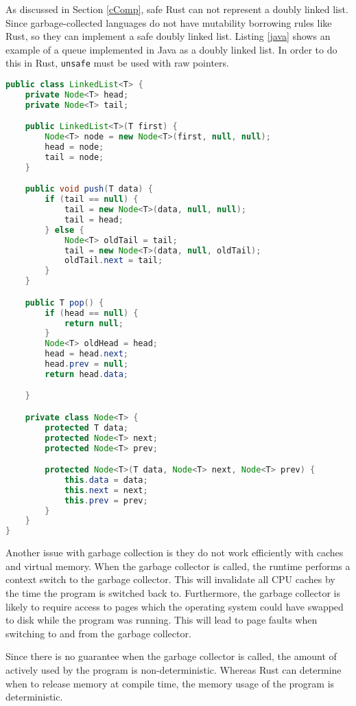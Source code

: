 \documentclass[10pt,a4paper,twocolumn]{article}
\begin{document}
As discussed in Section \ref{cComp}, safe Rust can not represent a doubly linked list.
Since garbage-collected languages do not have mutability borrowing rules like Rust, so they can
implement a safe doubly linked list.
Listing \ref{java} shows an example of a queue implemented in Java as a doubly linked list.
In order to do this in Rust, \lstinline{unsafe} must be used with raw pointers.

\begin{lstlisting}[language=Java, caption={An example of a queue in Java implemented as a doubly
	linked list.}, label=java]
public class LinkedList<T> {
	private Node<T> head;
	private Node<T> tail;

	public LinkedList<T>(T first) {
		Node<T> node = new Node<T>(first, null, null);
		head = node;
		tail = node;
	}

	public void push(T data) {
		if (tail == null) {
			tail = new Node<T>(data, null, null);
			tail = head;
		} else {
			Node<T> oldTail = tail;
			tail = new Node<T>(data, null, oldTail);
			oldTail.next = tail;
		}
	}

	public T pop() {
		if (head == null) {
			return null;
		}
		Node<T> oldHead = head;
		head = head.next;
		head.prev = null;
		return head.data;

	}

	private class Node<T> {
		protected T data;
		protected Node<T> next;
		protected Node<T> prev;

		protected Node<T>(T data, Node<T> next, Node<T> prev) {
			this.data = data;
			this.next = next;
			this.prev = prev;
		}
	}
}
\end{lstlisting}

Another issue with garbage collection is they do not work efficiently with caches and virtual
memory.
When the garbage collector is called, the runtime performs a context switch to the garbage
collector.
This will invalidate all CPU caches by the time the program is switched back to.
Furthermore, the garbage collector is likely to require access to pages which the operating
system could have swapped to disk while the program was running.
This will lead to page faults when switching to and from the garbage collector.

Since there is no guarantee when the garbage collector is called, the amount of actively used
by the program is non-deterministic.
Whereas Rust can determine when to release memory at compile time, the memory usage of the program
is deterministic.
\end{document}
